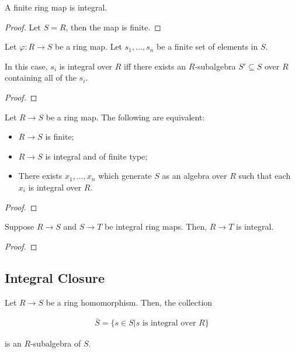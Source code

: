 \documentclass[Total.tex]{subfiles}
\begin{document}
			\begin{lemma}
				A finite ring map is integral. 
			\end{lemma}
			
			\begin{proof}
				Let $S=R$, then the map is finite. 
			\end{proof}
			
			\begin{lemma}
				Let $\varphi:R\rightarrow S$ be a ring map. Let $s_1,\dots,s_n$ be a finite set of elements in $S$. 
				
				In this case, $s_i$ is integral over $R$ iff there exists an $R$-subalgebra $S'\subseteq S$ over $R$ containing all of the $s_i$.
			\end{lemma}
			
			\begin{proof}
			\end{proof}
			
			\begin{lemma}
				Let $R\rightarrow S$ be a ring map. The following are equivalent:
				
				\begin{itemize}
					\item $R\rightarrow S$ is finite;
					\item $R\rightarrow S$ is integral and of finite type;
					\item There exists $x_1,\dots,x_n$ which generate $S$ as an algebra over $R$ such that each $x_i$ is integral over $R$.
				\end{itemize} 
			\end{lemma}
			
			\begin{proof}
			\end{proof}
			
			\begin{lemma}
				Suppose $R\rightarrow S$ and $S\rightarrow T$ be integral ring maps. Then, $R\rightarrow T$ is integral.
			\end{lemma}
			
			\begin{proof}
			\end{proof}
			
			\subsection{Integral Closure}
			
			\begin{lemma}
				Let $R\rightarrow S$ be a ring homomorphism. Then, the collection
				
				\begin{gather*}
					\bar{S}=\{s\in S|s\mbox{ is integral over }R\}
				\end{gather*}
				
				is an $R$-subalgebra of $S$.
			\end{lemma}
			
\end{document}
